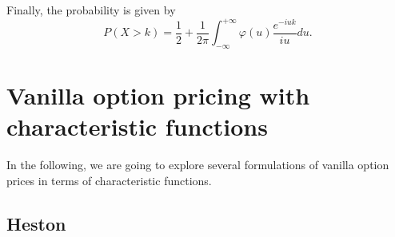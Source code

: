 \documentclass[12pt]{article}
\begin{document}
  Finally, the probability is given by
  \begin{equation}
    \label{inversion}
    P(X > k)=\frac{1}{2}+\frac{1}{2\pi}\int_{-\infty}^{+\infty}\varphi(u)\frac{e^{-iuk}}{iu}du.
  \end{equation}


\section{Vanilla option pricing with characteristic functions}

  In the following, we are going to explore several formulations of vanilla option prices in terms of
  characteristic functions.

  \subsection{Heston \cite{Heston}}
\end{document}

